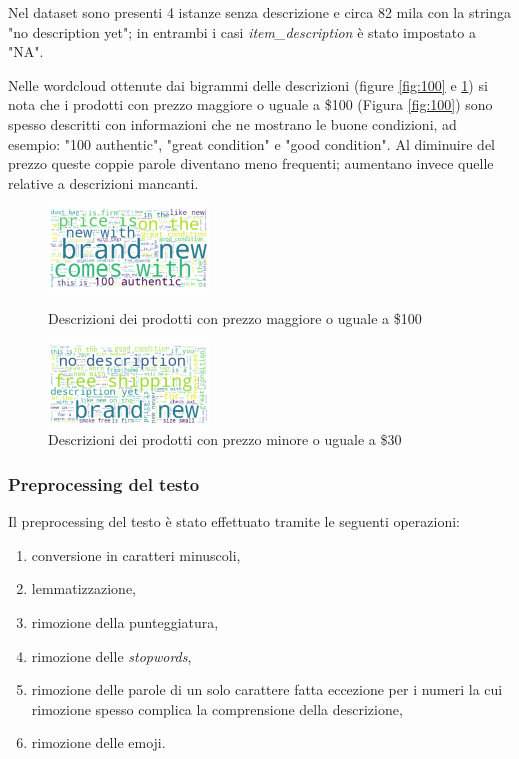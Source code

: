 \begin{itemize}
Nel dataset sono presenti 4 istanze senza descrizione e
circa 82 mila con la stringa "no description yet"; in entrambi i casi
\textit{item\_description} è stato impostato a "NA".

Nelle wordcloud ottenute dai bigrammi delle descrizioni (figure
\ref{fig:100} e \ref{Fig:minore_30}) si nota
che i prodotti con prezzo maggiore o uguale a \$100 (Figura \ref{fig:100}) sono
spesso descritti con informazioni che ne mostrano le buone condizioni, ad
esempio: "100 authentic", "great condition" e "good condition". Al diminuire del
prezzo queste coppie parole diventano meno frequenti; aumentano invece quelle
relative a descrizioni mancanti.

\end{itemize}

\begin{figure}[H]
  \begin{minipage}{0.48\textwidth}
    \centering
    \includegraphics[height=2.2cm, keepaspectratio]{maggiore_100}
    \caption{Descrizioni dei prodotti con prezzo maggiore o uguale a \$100}
    \label{fig:100}
  \end{minipage}\hfill
  \begin{minipage}{0.48\textwidth}
    \centering
    \includegraphics[height=2.2cm, keepaspectratio]{minore_30}
    \caption{Descrizioni dei prodotti con prezzo minore o uguale a \$30}
    \label{Fig:minore_30}
  \end{minipage}
\end{figure}


\subsubsection{Preprocessing del testo}

Il preprocessing del testo è stato effettuato tramite le seguenti operazioni:
\begin{enumerate}
  \item conversione in caratteri minuscoli,
  \item lemmatizzazione,
  \item rimozione della punteggiatura,
  \item rimozione delle \textit{stopwords},
  \item rimozione delle parole di un solo carattere fatta eccezione per i
        numeri la cui rimozione spesso complica la comprensione della descrizione,
  \item rimozione delle emoji.
\end{enumerate}

